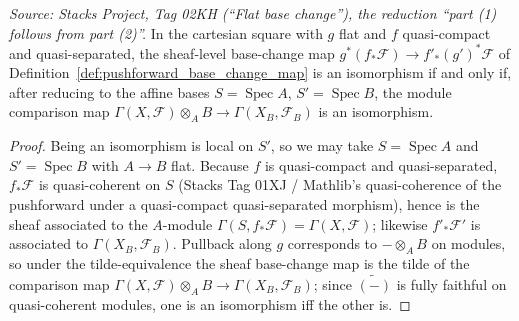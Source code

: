 \begin{lemma}
  \label{lem:flat_base_change_reduce_global_sections}
  \textit{Source: Stacks Project, Tag 02KH (``Flat base change''), the reduction
  ``part (1) follows from part (2)''.}
  In the cartesian square with \(g\) flat and \(f\) quasi-compact and
  quasi-separated, the sheaf-level base-change map
  \(g^*(f_*\mathcal{F}) \to f'_*(g')^*\mathcal{F}\) of
  Definition~\ref{def:pushforward_base_change_map} is an isomorphism if and only if,
  after reducing to the affine bases \(S = \operatorname{Spec} A\),
  \(S' = \operatorname{Spec} B\), the module comparison map
  \(\Gamma(X,\mathcal{F}) \otimes_A B \to \Gamma(X_B, \mathcal{F}_B)\) is an
  isomorphism.
  \begin{proof}
    Being an isomorphism is local on \(S'\), so we may take \(S = \operatorname{Spec} A\)
    and \(S' = \operatorname{Spec} B\) with \(A \to B\) flat. Because \(f\) is
    quasi-compact and quasi-separated, \(f_*\mathcal{F}\) is quasi-coherent on \(S\)
    (Stacks Tag 01XJ / Mathlib's quasi-coherence of the pushforward under a
    quasi-compact quasi-separated morphism), hence is the sheaf associated to the
    \(A\)-module \(\Gamma(S, f_*\mathcal{F}) = \Gamma(X,\mathcal{F})\); likewise
    \(f'_*\mathcal{F}'\) is associated to \(\Gamma(X_B,\mathcal{F}_B)\). Pullback along
    \(g\) corresponds to \(- \otimes_A B\) on modules, so under the
    tilde-equivalence the sheaf base-change map is the tilde of the comparison map
    \(\Gamma(X,\mathcal{F}) \otimes_A B \to \Gamma(X_B,\mathcal{F}_B)\); since
    \(\widetilde{(-)}\) is fully faithful on quasi-coherent modules, one is an
    isomorphism iff the other is.
  \end{proof}
\end{lemma}

